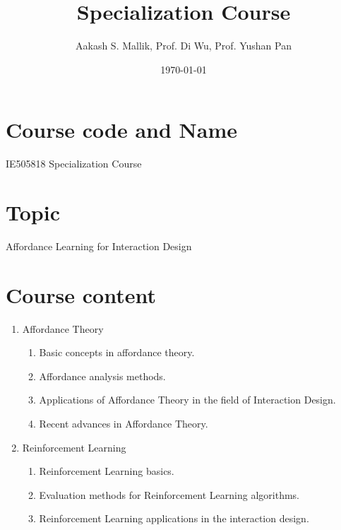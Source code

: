 \documentclass[letterpaper,12pt]{article}
\begin{document}
\title{Specialization Course}
\author{Aakash S. Mallik, Prof. Di Wu, Prof. Yushan Pan}
\date{\today}
\maketitle



\section{Course code and Name}

IE505818 Specialization Course

\section{Topic}

Affordance Learning for Interaction Design

\section{Course content}

\begin{enumerate}
	\item Affordance Theory
	\begin{enumerate}
		\item Basic concepts in affordance theory.
        \item Affordance analysis methods.
  
        \item Applications of Affordance Theory in the field of Interaction Design.
		\item Recent advances in Affordance Theory.
	\end{enumerate}
	\item Reinforcement Learning
	\begin{enumerate}
		\item Reinforcement Learning basics.
        \item Evaluation methods for Reinforcement Learning algorithms.
		\item Reinforcement Learning applications in the interaction design.
	\end{enumerate}
\end{enumerate}
\end{document}
